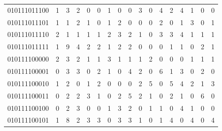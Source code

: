 \documentclass[10pt,a4paper]{article}
\begin{document}
\begin{longtable}{ |c|c|c|c|c|c|c|c|c|c|c|c|c|c|c|c|c| }
    010111011100              & 1                            & 3                                & 2                            & 0                              & 0   & 1   & 0   & 0   & 3   & 0   & 4   & 2   & 4   & 1   & 0   & 0   \\
    010111011101              & 1                            & 1                                & 2                            & 1                              & 0   & 1   & 2   & 0   & 0   & 0   & 2   & 0   & 1   & 3   & 0   & 1   \\
    010111011110              & 2                            & 1                                & 1                            & 1                              & 1   & 2   & 3   & 2   & 1   & 0   & 3   & 3   & 4   & 1   & 1   & 1   \\
    010111011111              & 1                            & 9                                & 4                            & 2                              & 2   & 1   & 2   & 2   & 0   & 0   & 0   & 1   & 1   & 0   & 2   & 1   \\
    010111100000              & 2                            & 3                                & 2                            & 1                              & 1   & 3   & 1   & 1   & 1   & 2   & 0   & 0   & 0   & 1   & 1   & 1   \\
    010111100001              & 0                            & 3                                & 3                            & 0                              & 2   & 1   & 0   & 4   & 2   & 0   & 6   & 1   & 3   & 0   & 2   & 0   \\
    010111100010              & 1                            & 2                                & 0                            & 1                              & 2   & 0   & 0   & 0   & 2   & 5   & 0   & 5   & 4   & 2   & 1   & 3   \\
    010111100011              & 0                            & 2                                & 2                            & 3                              & 1   & 0   & 2   & 5   & 2   & 1   & 0   & 2   & 1   & 0   & 6   & 0   \\
    010111100100              & 0                            & 2                                & 3                            & 0                              & 0   & 1   & 3   & 2   & 0   & 1   & 1   & 0   & 4   & 1   & 0   & 0   \\
    010111100101              & 1                            & 8                                & 2                            & 3                              & 3   & 0   & 3   & 3   & 1   & 0   & 1   & 4   & 0   & 4   & 0   & 4   \\

\end{longtable}
\end{document}
